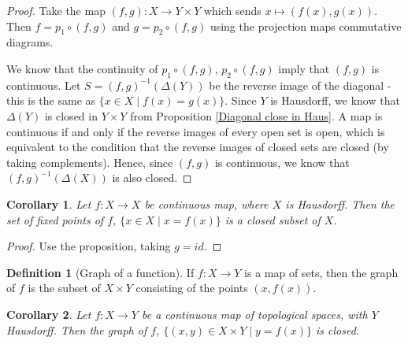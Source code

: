 \documentclass{article}
\theoremstyle{definition}
\newtheorem{defn}{Definition}[section]
\theoremstyle{plain}%
\newtheorem*{cor}{Corollary}
\theoremstyle{remark}
\newcommand{\cross}{\times}
\begin{document}
\begin{proof}
    Take the map $(f,g) : X \to Y \times Y$ which sends $x \mapsto (f(x), g(x))$. Then $f = p_1 \circ (f,g)$ and $g = p_2 \circ (f,g)$ using the projection maps commutative diagrams. 
    
    
    We know that the continuity of $p_1 \circ (f,g)$, $p_2 \circ (f,g)$ imply that $(f,g)$ is continuous. Let $S = (f,g)^{-1}(\Delta(Y))$ be the reverse image of the diagonal - this is the same as $\{x \in X \;|\; f(x) = g(x)\}$.
    Since $Y$ is Hausdorff, we know that $\Delta(Y)$ is closed in $Y \times Y$ from Proposition \ref{Diagonal close in Haus}. A map is continuous if and only if the reverse images of every open set is open, which is equivalent to the condition that the reverse images of closed sets are closed (by taking complements). Hence, since $(f,g)$ is continuous, we know that $(f,g)^{-1}(\Delta(X))$ is also closed.
\end{proof}

\begin{cor}
    Let $f: X \to X$ be continuous map, where $X$ is Hausdorff. Then the set of fixed points of $f$, $\{x \in X \; | \; x = f(x)\}$ is a closed subset of $X$.
\end{cor}

\begin{proof}
    Use the proposition, taking $g = id$.
\end{proof}

\begin{defn}[Graph of a function]
    If $f:X \to Y$ is a map of sets, then the graph of $f$ is the subset of $X \times Y$ consisting of the points $(x, f(x))$.
\end{defn}

\begin{cor}
    Let $f : X \to Y$ be a continuous map of topological spaces, with $Y$ Hausdorff. Then the graph of $f$, $\{(x,y) \in X \times Y\; | \; y = f(x)\}$ is closed.
\end{cor}
\end{document}
